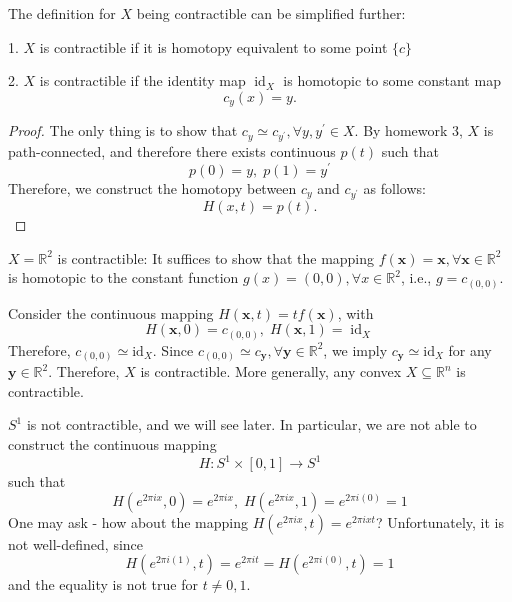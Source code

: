 \begin{proposition} The definition for $X$ being contractible can be simplified further:

1. \(X\) is contractible if it is homotopy equivalent to some point \(\{ c\}\)

2. \(X\) is contractible if the identity map \({\operatorname{id}}_{X}\) is homotopic to some constant map
\[
{c}_{y}\left( x\right)  = y.
\]
\end{proposition}

\begin{proof} The only thing is to show that \({c}_{y} \simeq  {c}_{{y}^{\prime }}, \forall y, {y}^{\prime } \in  X\). By homework 3, \(X\) is path-connected, and therefore there exists continuous \(p\left( t\right)\) such that
\[
p\left( 0\right)  = y, \;p\left( 1\right)  = {y}^{\prime }
\]
Therefore, we construct the homotopy between \({c}_{y}\) and \({c}_{{y}^{\prime }}\) as follows:
\[
H\left( {x, t}\right)  = p\left( t\right).
\]
\end{proof}

\begin{example} \(X = {\mathbb{R}}^{2}\) is contractible:
It suffices to show that the mapping \(f\left( \mathbf{x}\right)  = \mathbf{x}, \forall \mathbf{x} \in  {\mathbb{R}}^{2}\) is homotopic to the constant function \(g\left( x\right)  = \left( {0, 0}\right), \forall x \in  {\mathbb{R}}^{2}\), i.e., \(g = {c}_{\left( 0, 0\right) }\).

Consider the continuous mapping \(H\left( {\mathbf{x}, t}\right)  = {tf}\left( \mathbf{x}\right)\), with
\[
H\left( {\mathbf{x}, 0}\right)  = {c}_{\left( 0, 0\right) }, \;H\left( {\mathbf{x}, 1}\right)  = {\operatorname{id}}_{X}
\]
Therefore, \({c}_{\left( 0, 0\right) } \simeq  {\mathrm{{id}}}_{X}\). Since \({c}_{\left( 0, 0\right) } \simeq  {c}_{\mathbf{y}}, \forall \mathbf{y} \in  {\mathbb{R}}^{2}\), we imply \({c}_{\mathbf{y}} \simeq  {\mathrm{{id}}}_{X}\) for any \(\mathbf{y} \in  {\mathbb{R}}^{2}\). Therefore, \(X\) is contractible. More generally, any convex \(X \subseteq  {\mathbb{R}}^{n}\) is contractible.
\end{example}

\begin{remark}
\({S}^{1}\) is not contractible, and we will see later. In particular, we are not able to construct the continuous mapping
\[
H : {S}^{1} \times  \left\lbrack  {0, 1}\right\rbrack   \rightarrow  {S}^{1}
\]
such that
\[
H\left( {{e}^{2\pi ix}, 0}\right)  = {e}^{2\pi ix}, \;H\left( {{e}^{2\pi ix}, 1}\right)  = {e}^{{2\pi i}\left( 0\right) } = 1
\]
One may ask - how about the mapping \(H\left( {{e}^{2\pi ix}, t}\right)  = {e}^{2\pi ixt}\)? Unfortunately, it is not well-defined, since
\[
H\left( {{e}^{{2\pi i}\left( 1\right) }, t}\right)  = {e}^{2\pi it} = H\left( {{e}^{{2\pi i}\left( 0\right) }, t}\right)  = 1
\]
and the equality is not true for \(t \neq  0, 1\).
\end{remark}

